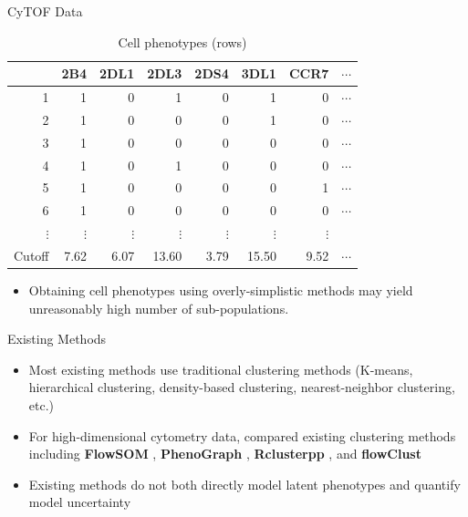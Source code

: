\documentclass[ignorenonframetext,]{beamer}
\providecommand{\tightlist}{%
  \setlength{\itemsep}{0pt}\setlength{\parskip}{0pt}}
\begin{document}
\begin{frame}{CyTOF Data}

\begin{table}
\begin{tabular}{r|rrrrrrr}
  \hline
  & 2B4 & 2DL1 & 2DL3 & 2DS4 & 3DL1 & CCR7 & $\cdots$ \\
  \hline
  1 & 1 & 0 & 1 & 0 & 1 & 0 & $\cdots$ \\
  2 & 1 & 0 & 0 & 0 & 1 & 0 & $\cdots$ \\
  3 & 1 & 0 & 0 & 0 & 0 & 0 & $\cdots$ \\
  4 & 1 & 0 & 1 & 0 & 0 & 0 & $\cdots$ \\
  5 & 1 & 0 & 0 & 0 & 0 & 1 & $\cdots$ \\
  6 & 1 & 0 & 0 & 0 & 0 & 0  & $\cdots$ \\
  $\vdots$ & $\vdots$& $\vdots$& $\vdots$& $\vdots$& $\vdots$& $\vdots$& \\
  \hline
  Cutoff & 7.62 & 6.07 & 13.60 & 3.79 & 15.50 & 9.52 & $\cdots$\\
  \hline
\end{tabular}
\caption{Cell phenotypes (rows)}
\end{table}

\begin{itemize}
\tightlist
\item
  Obtaining cell phenotypes using overly-simplistic methods may yield
  unreasonably high number of sub-populations.
\end{itemize}

\end{frame}

\begin{frame}{Existing Methods}

\begin{itemize}
\setlength\itemsep{1em}
  \item Most existing methods use traditional clustering methods (K-means,
    hierarchical clustering, density-based clustering, nearest-neighbor
    clustering, etc.)
  \item For high-dimensional cytometry data, \cite{weber2016comparison}
    compared existing clustering methods including \textbf{FlowSOM}
    \citep{van2015flowsom}, \textbf{PhenoGraph} \citep{levine2015data}, 
    \textbf{Rclusterpp} \citep{linderman2013package}, 
    and \textbf{flowClust} \citep{lo2009flowclust}
  \item
    Existing methods do not both directly model latent phenotypes and quantify
    model uncertainty
  \end{itemize}
\end{frame}
\end{document}

